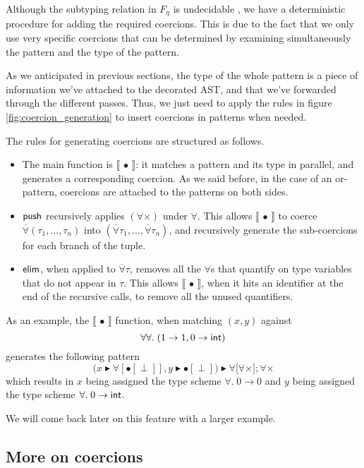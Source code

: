 \documentclass[10pt,a4paper,twoside,titlepage,twocolumn]{article}
\newcommand{\forallvec}{\ensuremath{\overline{\forall}}}
\begin{document}
Although the subtyping relation in $F_\eta$ is undecidable \cite{mitchell-88},
we have a deterministic procedure for adding the required coercions. This is due
to the fact that we only use very specific coercions that can be determined by
examining simultaneously the pattern and the type of the pattern.

As we anticipated in previous sections, the type of the whole pattern is a piece
of information we've attached to the decorated AST, and that we've forwarded
through the different passes. Thus, we just need to apply the rules in figure
\vref{fig:coercion_generation} to insert coercions in patterns when needed.

The rules for generating coercions are structured as follows.
\begin{itemize}
  \item The main function is $\llbracket\,\bullet\,\rrbracket$: it matches a
    pattern and its type in parallel, and generates a corresponding coercion. As
    we said before, in the case of an or-pattern, coercions are attached to the
    patterns on both sides.
  \item $\text{\textsf{push}}$ recursively applies $(\forall\times)$ under $\forall$. This
    allows $\llbracket\,\bullet\,\rrbracket$ to coerce $\forallvec (\tau_1,
    \dots, \tau_n)$ into $(\forallvec \tau_1, \dots, \forallvec \tau_n)$, and
    recursively generate the sub-coercions for each branch of the tuple.
  \item $\text{\textsf{elim}}$, when applied to $\forallvec\tau$, removes all the
    $\forall$s that quantify on type variables that do not appear in $\tau$.
    This allows $\llbracket\,\bullet\,\rrbracket$, when it hits an identifier at
    the end of the recursive calls, to remove all the unused quantifiers.
\end{itemize}

As an example, the $\llbracket\,\bullet\,\rrbracket$ function, when matching
$(x, y)$ against $$\forall\forall.\; (1 \to 1, 0 \to \text{\textsf{int}})$$
generates the following pattern
$$\big(x \blacktriangleright \forall[\bullet[\perp]],
   y \blacktriangleright \bullet[\perp]\big)
\blacktriangleright \forall\big[\forall\times\big]; \forall\times$$
which results in $x$ being assigned the type scheme $\forall.\; 0 \to 0$ and $y$
being assigned the type scheme $\forall.\; 0 \to \text{\textsf{int}}$.

We will come back later on this feature with a larger example.

\subsection{More on coercions}
\end{document}
